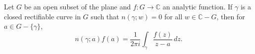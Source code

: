 Let $G$ be an open subset of the plane and $f: G \to \mathbb{C}$ an analytic function. If $\gamma$ is a closed rectifiable curve in $G$ such that $n(\gamma; w) = 0$ for all $w \in \mathbb{C} - G$, then for $a \in G - \{\gamma\}$,
$$
n(\gamma; a) f(a) = \frac{1}{2\pi i} \int_{\gamma} \frac{f(z)}{z - a} \, dz.
$$
